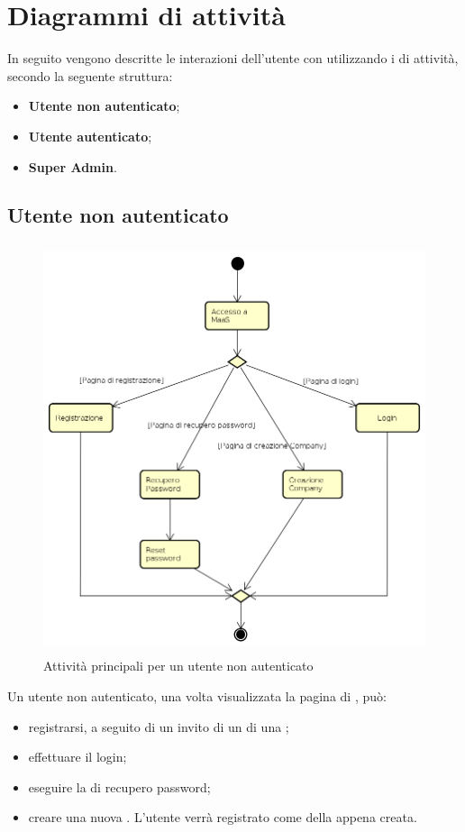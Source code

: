 \section{Diagrammi di attività}
In seguito vengono descritte le interazioni dell'utente con  utilizzando i  di attività, secondo la seguente struttura:
\begin{itemize}
\item \textbf{Utente non autenticato};
\item \textbf{Utente autenticato};
\item \textbf{Super Admin}.
\end{itemize}
\subsection{Utente non autenticato}
\begin{figure}[H]
\begin{center}
\includegraphics[height=12cm]{res/sections/backend/activities/principaliSenzaAuth.png}
\caption{Attività principali per un utente non autenticato}
\end{center}
\end{figure}
Un utente non autenticato, una volta visualizzata la pagina di , può:
\begin{itemize}
\item registrarsi, a seguito di un invito di un  di una ;
\item effettuare il login;
\item eseguire la  di recupero password;
\item creare una nuova . L'utente verrà registrato come  della  appena creata.
\end{itemize}
